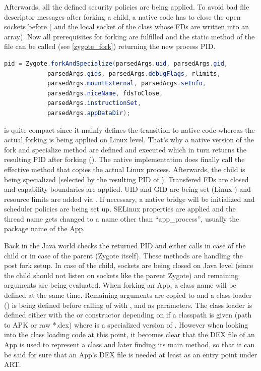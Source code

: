 Afterwards, all the defined security policies are being applied. To avoid bad file
descriptor messages after forking a child, a native code has to close the open sockets before ( and the local socket  of the
 class whose FDs are written into an 
array).
Now all prerequisites for forking are fulfilled and the static method
 of the  file can be called
(see \autoref{zygote_fork}) returning the new process PID.
\begin{lstlisting}[language=Java, caption=Zygote Fork Call, label=zygote_fork]
pid = Zygote.forkAndSpecialize(parsedArgs.uid, parsedArgs.gid,
            parsedArgs.gids, parsedArgs.debugFlags, rlimits,
            parsedArgs.mountExternal, parsedArgs.seInfo,
            parsedArgs.niceName, fdsToClose,
            parsedArgs.instructionSet,
            parsedArgs.appDataDir);
\end{lstlisting}
 is quite compact since it mainly defines the transition
to native code whereas the actual forking is being applied on Linux level. That's why
a native version of the fork and specialize method are defined and executed
which in turn returns the resulting PID after forking
().
The native implementation does finally call the effective  method
that copies the actual Linux process. Afterwards, the child is being
specialized (selected by the resulting PID of ).
Transfered FDs are closed and capability boundaries are applied.
UID and GID are being set (Linux ) and resource limits are added via .
If necessary, a native bridge will be initialized and scheduler policies
are being set up. SELinux properties are applied and the thread name gets
changed to a name other than ``app\_process'', usually the package name of the App.

Back in the Java world  checks the returned PID and either calls  in case of the child or
 in case of the parent (Zygote itself).
These methods are handling the post fork setup. In case of the child, sockets are being closed on Java level (since the child should not listen on sockets like the parent Zygote) and remaining arguments are being evaluated. When forking an App, a class name will be defined at the same time. Remaining arguments are copied to  and a class loader () is being defined before calling  of  with ,  and  as parameters. The class loader  is defined
either with the  or  constructor depending on if a classpath is
given (path to APK or raw *.dex) where  is a specialized version of .
However when looking into the class loading code at this point, it becomes clear that the DEX file of an App is used to represent a class and later finding its main method, so that
it can be said for sure that an App's DEX file is needed at least as an entry point under ART.


